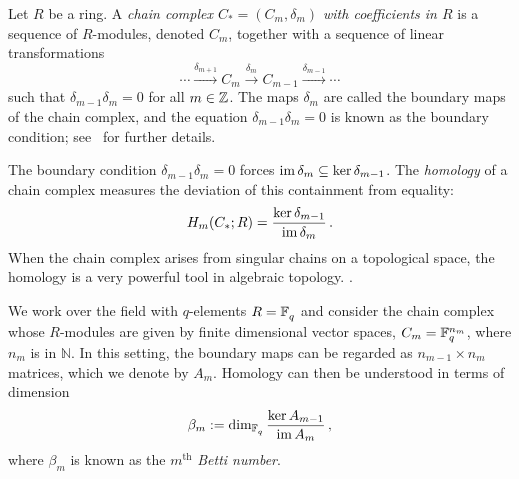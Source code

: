 Let $R$ be a ring. A {\em chain complex $C_*=(C_m, \delta_m)$ with coefficients in
$R$} is a sequence of $R$-modules, denoted $C_m$, together with a sequence of
linear transformations 
\[
  \cdots \xrightarrow{\delta_{m+1}} C_m \xrightarrow{\delta_m}
  C_{m-1} \xrightarrow{\delta_{m-1}} \cdots
\]
such that $\delta_{m-1}\delta_m = 0$ for all $m \in \mathbb{Z}$.  The maps $\delta_m$
are called the boundary maps of the chain complex, and the equation
$\delta_{m-1} \delta_m = 0$ is known as the boundary condition;
see~\cite{cartan2016homological} for further details. 

The boundary condition $\delta_{m-1}\delta_m=0$ forces $\operatorname{\mathrm{im}} \delta_m \subseteq \ker \delta_{m-1}$.
The {\em homology} of a chain complex measures the deviation of this containment
from equality:
\begin{equation*}
  \label{eqn:hom}
  H_m(C_*;R) = \frac{\ker \delta_{m-1}}{\operatorname{\mathrm{im}} \delta_m} \, .
\end{equation*}
When the chain complex arises from singular chains on a topological
space, the homology is a very powerful tool in algebraic 
topology. \cite{hatcher2002algebraic}  .

We work over the field with $q$-elements $R = \mathbb{F}_q^{}$ and consider the chain complex whose $R$-modules are given by finite dimensional vector spaces,  $C_m = \mathbb{F}_q^{n_m}$, where $n_m$ is in $\mathbb{N}$. In this setting, the boundary maps can be regarded as $n_{m-1}\times n_m $ matrices, which we denote by $A_m$. Homology can then be understood in terms of dimension 
\begin{equation*}
  \beta_m := \dim_{\mathbb{F}_q^{}} \frac{\ker A_{m-1}}{\operatorname{\mathrm{im}} A_m} \, ,
  \label{eqn:betti_numbers}
\end{equation*}
where $\beta_m$ is known as the $m^\mathrm{th}$ {\em Betti number}.

%

